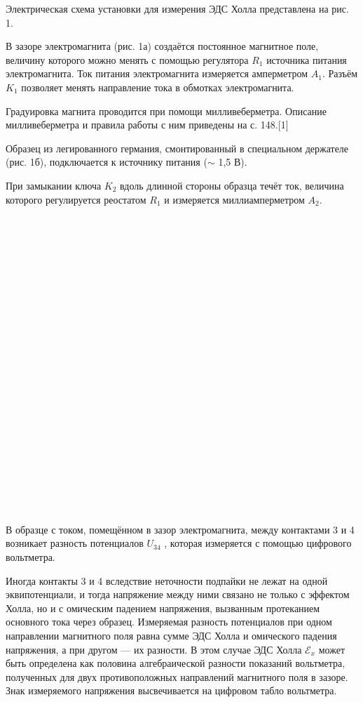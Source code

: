  Электрическая схема установки для измерения ЭДС Холла представлена на рис. 1.
 
    В зазоре электромагнита (рис. 1а) создаётся постоянное магнитное поле, величину которого можно менять с помощью регулятора $R_1$ источника питания электромагнита. Ток питания электромагнита измеряется амперметром $A_1$. Разъём $K_1$ позволяет менять направление тока в обмотках электромагнита.
    
    Градуировка магнита проводится при помощи милливеберметра. Описание милливеберметра и правила работы с ним приведены на с. 148.[1]
    
    Образец из легированного германия, смонтированный в специальном держателе (рис. 1б), подключается к источнику питания ($\sim$ 1,5 В).

При замыкании ключа $K_2$ вдоль длинной стороны образца течёт ток, величина которого регулируется реостатом $R_1$ и измеряется миллиамперметром $A_2$.
\\
\\
\\
\\
\\
\\
\\
\\
\\
\\
\\
\\
\\
\\
\\
\\
\\
\\
\\
\\
\\
\\
\\
\\
   В образце с током, помещённом в зазор электромагнита, между контактами 3 и 4 возникает разность потенциалов $U_{34}$ , которая измеряется с помощью цифрового вольтметра.
   
   Иногда контакты 3 и 4 вследствие неточности подпайки не лежат на одной эквипотенциали, и тогда напряжение между ними связано не только с эффектом Холла, но и с омическим падением напряжения, вызванным протеканием основного тока через образец. Измеряемая разность потенциалов при одном направлении магнитного поля равна сумме ЭДС Холла и омического падения напряжения, а при другом — их разности. В этом случае ЭДС Холла $\mathscr{E}_x$ может быть определена как половина алгебраической разности показаний вольтметра, полученных для двух противоположных направлений магнитного поля в зазоре. Знак измеряемого напряжения высвечивается на цифровом табло вольтметра.

